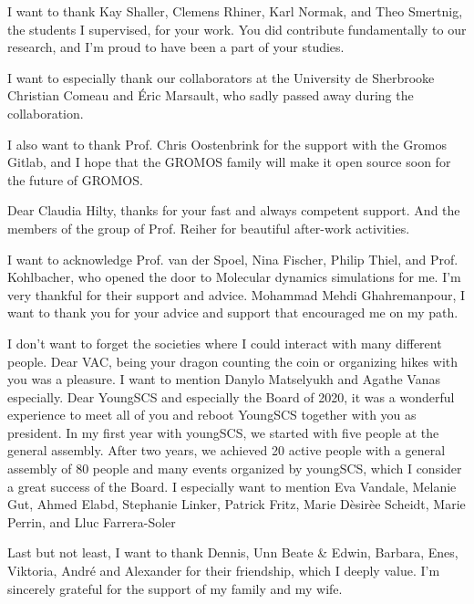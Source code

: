 I want to thank Kay Shaller, Clemens Rhiner, Karl Normak, and Theo Smertnig, the students I supervised, for your work. You did contribute fundamentally to our research, and I'm proud to have been a part of your studies.

I want to especially thank our collaborators at the University de Sherbrooke Christian Comeau and {\' E}ric Marsault, who sadly passed away during the collaboration.

I also want to thank Prof. Chris Oostenbrink for the support with the Gromos Gitlab, and I hope that the GROMOS family will make it open source soon for the future of GROMOS.


Dear Claudia Hilty, thanks for your fast and always competent support. And the members of the group of Prof. Reiher for beautiful after-work activities.

I want to acknowledge Prof. van der Spoel, Nina Fischer, Philip Thiel, and Prof. Kohlbacher, who opened the door to Molecular dynamics simulations for me. I'm very thankful for their support and advice.  
Mohammad Mehdi Ghahremanpour, I want to thank you for your advice and support that encouraged me on my path.

I don't want to forget the societies where I could interact with many different people.
Dear VAC, being your dragon counting the coin or organizing hikes with you was a pleasure. I want to mention Danylo Matselyukh and Agathe Vanas especially. 
Dear YoungSCS and especially the Board of 2020, it was a wonderful experience to meet all of you and reboot YoungSCS together with you as president. In my first year with youngSCS, we started with five people at the general assembly. After two years, we achieved 20 active people with a general assembly of 80 people and many events organized by youngSCS, which I consider a great success of the Board. I especially want to mention Eva Vandale, Melanie Gut, Ahmed Elabd, Stephanie Linker, Patrick Fritz, Marie D{\`e}sir{\`e}e Scheidt, Marie Perrin, and Lluc Farrera-Soler

Last but not least, I want to thank Dennis, Unn Beate \& Edwin, Barbara, Enes, Viktoria, Andr{\'e} and Alexander for their friendship, which I deeply value.
I'm sincerely grateful for the support of my family and my wife.

\begin{center}
    \begin{minipage}[t]{.5\linewidth}
    \end{minipage}
\end{center}
